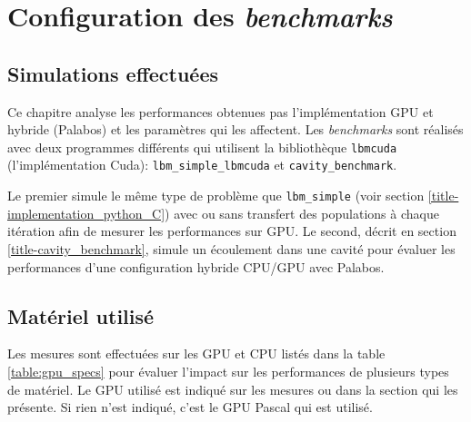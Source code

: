 \section{Configuration des \textit{benchmarks}}
\subsection{Simulations effectuées}
Ce chapitre analyse les performances obtenues pas l'implémentation \acs{GPU} et hybride (Palabos) et les paramètres qui les affectent. Les \textit{benchmarks} sont réalisés avec deux programmes différents qui utilisent la bibliothèque \texttt{lbmcuda} (l'implémentation Cuda): \texttt{lbm\_simple\_lbmcuda} et \texttt{cavity\_benchmark}.

Le premier simule le même type de problème que \texttt{lbm\_simple} (voir section \ref{title-implementation_python_C}) avec ou sans transfert des populations à chaque itération afin de mesurer les performances sur \acs{GPU}. Le second, décrit en section \ref{title-cavity_benchmark}, simule un écoulement dans une cavité pour évaluer les performances d'une configuration hybride \acs{CPU}/\acs{GPU} avec Palabos.  

\subsection{Matériel utilisé}
Les mesures sont effectuées sur les \acs{GPU} et \acs{CPU} listés dans la table \ref{table:gpu_specs} pour évaluer l'impact sur les performances de plusieurs types de matériel. Le \acs{GPU} utilisé est indiqué sur les mesures ou dans la section qui les présente. Si rien n'est indiqué, c'est le \acs{GPU} Pascal qui est utilisé.

